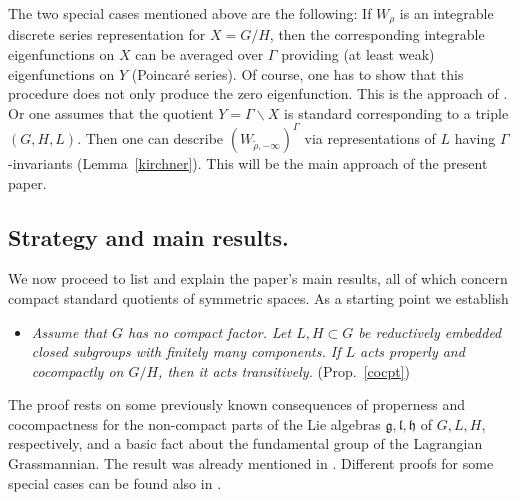 \documentclass[10]{amsart}
\theoremstyle{remark}
\theoremstyle{definition}
\numberwithin{equation}{section}
\newcommand{\fg}{{\mathfrak g}}
\newcommand{\fh}{{\mathfrak h}}
\newcommand{\fl}{{\mathfrak l}}
\begin{document}
The two special cases mentioned above are the following: If $W_\rho$ is an integrable discrete series representation for $X=G/H$, then the corresponding integrable   eigenfunctions on $X$ can be averaged over 
$\Gamma$ providing (at least weak) eigenfunctions on $Y$ (Poincar\' e series). Of course, one has to show that this procedure does not only produce the zero eigenfunction. 
This is the approach of \cite{KK2}. Or one assumes that the quotient $Y=\Gamma\backslash X$ is standard  corresponding to a triple $(G,H,L)$. Then one can describe 
$(W_{\widetilde{\rho},-\infty})^\Gamma$ via representations of $L$ having $\Gamma$-invariants (Lemma~\ref{kirchner}). This will be the main approach of the present paper. 


\subsection{Strategy and main results.} 

We now proceed to list and explain the paper's main results, all of which concern compact standard quotients of symmetric spaces. As a starting point we establish
\begin{itemize}
\item[({\bf A})] {\em Assume that $G$ has no compact factor. Let  $L,H\subset G$ be reductively embedded closed subgroups with finitely many components. If $L$ acts properly and cocompactly
on $G/H$, then it acts transitively.} (Prop.~\ref{cocpt})
\end{itemize}
The proof 
rests on some previously known consequences of properness and cocompactness for the non-compact parts of the Lie algebras $\fg,\fl,\fh$ of $G,L,H$, respectively, and a basic fact about the fundamental group of the Lagrangian Grassmannian. The result was already mentioned in \cite{MO21}. Different proofs for some special cases can be found also in \cite{BoTr25}.
\end{document}
